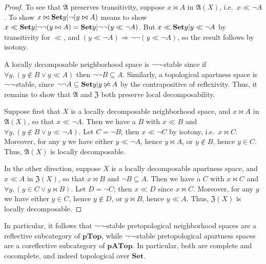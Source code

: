 \documentclass{article}
\def\cpl#1{\neg #1}
\let\implies\Rightarrow
\def\anti{\mathfrak{A}}
\def\neigh{\mathfrak{Z}}
\def\nn{\ensuremath{\neg\neg}}
\def\Set{\mathbf{Set}}
\def\PTop{\mathbf{pTop}}
\def\APTop{\mathbf{pATop}}
\def\APTopnn{\mathbf{pATop}_{\nn}}
\begin{document}
\begin{proof}
  To see that $\anti$ preserves transitivity, suppose $x\bowtie A$ in $\anti(X)$, i.e.\ $x\ll \cpl{A}$.
  To show $x\bowtie \setof{y|\neg(y\bowtie A)}$ means to show $x\ll \setof{y|\neg\neg(y\bowtie A)} = \setof{y|\neg\neg(y\ll \cpl{A})}$.
  But $x\ll \setof{y|y\ll \cpl{A}}$ by transitivity for $\ll$, and $(y\ll \cpl{A})\implies\neg\neg(y\ll\cpl{A})$, so the result follows by isotony.

  A locally decomposable neighborhood space is \nn-stable since if $\forall y, (y\notin B \lor y \ll A)$ then $\neg\neg B \subseteq A$.
  Similarly, a topological apartness space is \nn-stable, since $\cpl{\cpl{A}}\subseteq \setof{ y | y \not\bowtie A }$ by the contrapositive of reflexivity.
  Thus, it remains to show that $\anti$ and $\neigh$ both preserve local decomposability.

  Suppose first that $X$ is a locally decomposable neighborhood space, and $x \bowtie A$ in $\anti(X)$, so that $x\ll \cpl{A}$.
  Then we have a $B$ with $x\ll B$ and $\forall y, (y\notin B \lor y\ll \cpl{A})$.
  Let $C = \cpl{B}$; then $x\ll \cpl{C}$ by isotony, i.e.\ $x\bowtie C$.
  Moreover, for any $y$ we have either $y\ll\cpl{A}$, hence $y\bowtie A$, or $y\notin B$, hence $y\in C$.
  Thus, $\anti(X)$ is locally decomposable.

  In the other direction, suppose $X$ is a locally decomposable apartness space, and $x\ll A$ in $\neigh(X)$, so that $x\bowtie B$ and $\cpl{B}\subseteq A$.
  Then we have a $C$ with $x\bowtie C$ and $\forall y, (y\in C \lor y\bowtie B)$.
  Let $D = \cpl{C}$; then $x\ll D$ since $x\bowtie C$.
  Moreover, for any $y$ we have either $y\in C$, hence $y\notin D$, or $y\bowtie B$, hence $y\ll A$.
  Thus, $\neigh(X)$ is locally decomposable.
\end{proof}

\begin{rmk}
  In particular, it follows that \nn-stable pretopological neighborhood spaces are a reflective subcategory of $\PTop$, while \nn-stable pretopological apartness spaces are a coreflective subcategory of $\APTop$.
  In particular, both are complete and cocomplete, and indeed topological over $\Set$.
\end{rmk}
\end{document}
